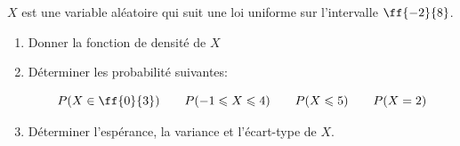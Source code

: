 \pagebreak

\begin{exercice_cours}[\quad]{}

	$X$ est une variable aléatoire qui suit une loi uniforme sur l'intervalle $\ff{-2}{8}$.

\begin{enumerate}
	\item Donner la fonction de densité de $X$ 
	\begin{blocvisiblex}[height=1.5]
{\quad}
\end{blocvisiblex}
	\item Déterminer les probabilité suivantes:
	
	$$P(X  \in \ff{0}{3}) \qquad P(-1\leqslant X \leqslant 4) \qquad P(X\leqslant 5)  \qquad P(X=2)$$
	
\begin{blocvisiblex}[height=2.]
{\quad}
\end{blocvisiblex}	
	\item Déterminer l'espérance, la variance et l'écart-type de $X$.
	
\begin{blocvisiblex}[height=2.]
{\quad}
\end{blocvisiblex}	
	
\end{enumerate}
\end{exercice_cours}

